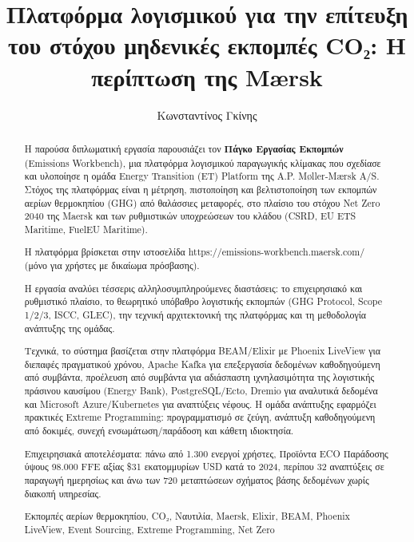 \documentclass[11pt,a4paper,greek,twoside]{template-xe}
\title{Πλατφόρμα λογισμικού για την επίτευξη του στόχου μηδενικές
εκπομπές CO₂: Η περίπτωση της Mærsk}
\author{Κωνσταντίνος Γκίνης}
\begin{document}
\maketitle

\frontmatter

\begin{abstract}
Η παρούσα διπλωματική εργασία παρουσιάζει τον \textbf{Πάγκο Εργασίας
Εκπομπών} (Emissions Workbench), μια πλατφόρμα λογισμικού παραγωγικής
κλίμακας που σχεδίασε και υλοποίησε η ομάδα Energy Transition (ET)
Platform της A.P. Møller-Mærsk A/S. Στόχος της πλατφόρμας είναι η
μέτρηση, πιστοποίηση και βελτιστοποίηση των εκπομπών αερίων θερμοκηπίου
(GHG) από θαλάσσιες μεταφορές, στο πλαίσιο του στόχου Net Zero 2040 της
Maersk και των ρυθμιστικών υποχρεώσεων του κλάδου (CSRD, EU ETS
Maritime, FuelEU Maritime).

Η πλατφόρμα βρίσκεται στην ιστοσελίδα
https://emissions-workbench.maersk.com/ (μόνο για χρήστες με δικαίωμα
πρόσβασης).

Η εργασία αναλύει τέσσερις αλληλοσυμπληρούμενες διαστάσεις: το
επιχειρησιακό και ρυθμιστικό πλαίσιο, το θεωρητικό υπόβαθρο λογιστικής
εκπομπών (GHG Protocol, Scope 1/2/3, ISCC, GLEC), την τεχνική
αρχιτεκτονική της πλατφόρμας και τη μεθοδολογία ανάπτυξης της ομάδας.

Τεχνικά, το σύστημα βασίζεται στην πλατφόρμα BEAM/Elixir με Phoenix
LiveView για διεπαφές πραγματικού χρόνου, Apache Kafka για επεξεργασία
δεδομένων καθοδηγούμενη από συμβάντα, προέλευση από συμβάντα για
αδιάσπαστη ιχνηλασιμότητα της λογιστικής πράσινου καυσίμου (Energy
Bank), PostgreSQL/Ecto, Dremio για αναλυτικά δεδομένα και Microsoft
Azure/Kubernetes για αναπτύξεις νέφους. Η ομάδα ανάπτυξης εφαρμόζει
πρακτικές Extreme Programming: προγραμματισμό σε ζεύγη, ανάπτυξη
καθοδηγούμενη από δοκιμές, συνεχή ενσωμάτωση/παράδοση και κάθετη
ιδιοκτησία.

Επιχειρησιακά αποτελέσματα: πάνω από 1.300 ενεργοί χρήστες, Προϊόντα ECO
Παράδοσης ύψους 98.000 FFE αξίας \$31 εκατομμυρίων USD κατά το 2024,
περίπου 32 αναπτύξεις σε παραγωγή ημερησίως και άνω των 720 μεταπτώσεων
σχήματος βάσης δεδομένων χωρίς διακοπή υπηρεσίας.
\begin{keywords}
Εκπομπές αερίων θερμοκηπίου, CO₂, Ναυτιλία, Maersk, Elixir, BEAM,
Phoenix LiveView, Event Sourcing, Extreme Programming, Net Zero
\end{keywords}
\end{abstract}
\end{document}
